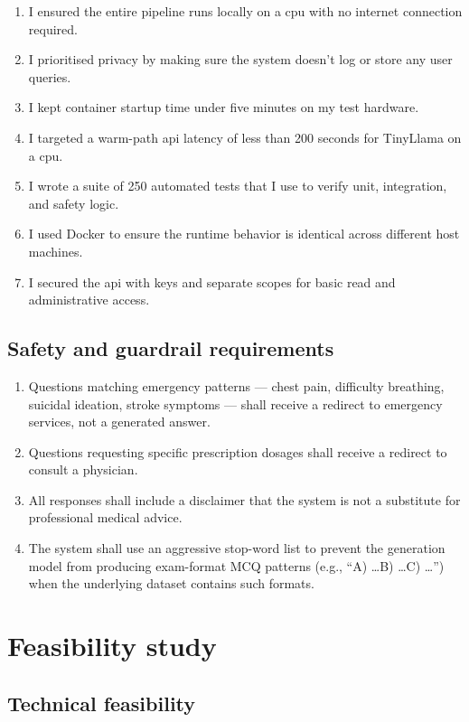 \begin{enumerate}
    \item I ensured the entire pipeline runs locally on a \ac{cpu} with no internet connection required.
    \item I prioritised privacy by making sure the system doesn't log or store any user queries.
    \item I kept container startup time under five minutes on my test hardware.
    \item I targeted a warm-path \ac{api} latency of less than 200 seconds for TinyLlama on a \ac{cpu}.
    \item I wrote a suite of 250 automated tests that I use to verify unit, integration, and safety logic.
    \item I used Docker to ensure the runtime behavior is identical across different host machines.
    \item I secured the \ac{api} with keys and separate scopes for basic read and administrative access.
\end{enumerate}

\subsection{Safety and guardrail requirements}

\begin{enumerate}
    \item Questions matching emergency patterns --- chest pain, difficulty breathing, suicidal ideation, stroke symptoms --- shall receive a redirect to emergency services, not a generated answer.
    \item Questions requesting specific prescription dosages shall receive a redirect to consult a physician.
    \item All responses shall include a disclaimer that the system is not a substitute for professional medical advice.
    \item The system shall use an aggressive stop-word list to prevent the generation model from producing exam-format MCQ patterns (e.g., ``A) \ldots B) \ldots C) \ldots'') when the underlying dataset contains such formats.
\end{enumerate}

\section{Feasibility study}

\subsection{Technical feasibility}

